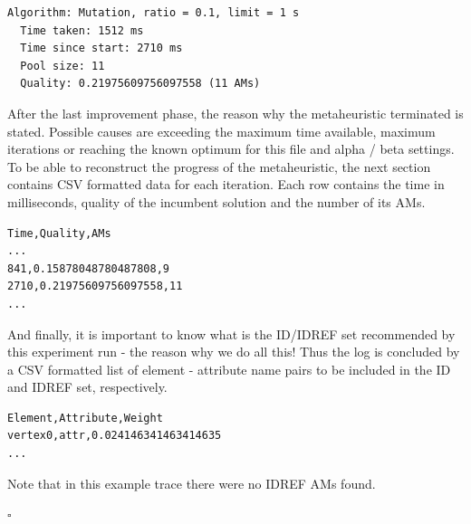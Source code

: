 \documentclass[a4paper,12pt,oneside]{report}
\theoremstyle{definition}
\begin{document}
\begin{footnotesize}
\begin{verbatim}
Algorithm: Mutation, ratio = 0.1, limit = 1 s
  Time taken: 1512 ms
  Time since start: 2710 ms
  Pool size: 11
  Quality: 0.21975609756097558 (11 AMs)
\end{verbatim}
\end{footnotesize}

After the last improvement phase, the reason why the metaheuristic terminated is stated. Possible causes are exceeding the maximum time available, maximum iterations or reaching the known optimum for this file and alpha / beta settings.
\\

To be able to reconstruct the progress of the metaheuristic, the next section contains CSV  formatted data for each iteration. Each row contains the time in milliseconds, quality of the incumbent solution and the number of its AMs.

\begin{footnotesize}
\begin{verbatim}
Time,Quality,AMs
...
841,0.15878048780487808,9
2710,0.21975609756097558,11
...
\end{verbatim}
\end{footnotesize}

And finally, it is important to know what is the ID/IDREF set recommended by this experiment run - the reason why we do all this! Thus the log is concluded by a CSV formatted list of element - attribute name pairs to be included in the ID and IDREF set, respectively.

\begin{footnotesize}
\begin{verbatim}
Element,Attribute,Weight
vertex0,attr,0.024146341463414635
...
\end{verbatim}
\end{footnotesize}

Note that in this example trace there were no IDREF AMs found.

\flushright
$\square$
\end{document}
